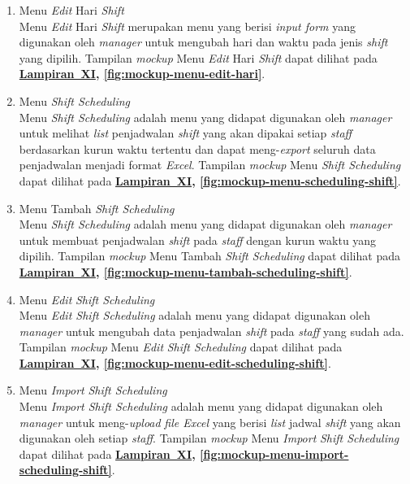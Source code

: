 \begin{enumerate}
    \item Menu \textit{Edit} Hari \textit{Shift}
    \\ Menu \textit{Edit} Hari \textit{Shift} merupakan menu yang berisi \textit{input form} yang digunakan oleh \textit{manager} untuk mengubah hari dan waktu pada jenis \textit{shift} yang dipilih. Tampilan \textit{mockup} Menu \textit{Edit} Hari \textit{Shift} dapat dilihat pada \textbf{\hyperref[sec:mockup-aplikasi-presensi-online]{Lampiran~XI}, \ref{fig:mockup-menu-edit-hari}}.

    \item Menu \textit{Shift Scheduling}
    \\ Menu \textit{Shift Scheduling} adalah menu yang didapat digunakan oleh \textit{manager} untuk melihat \textit{list} penjadwalan \textit{shift} yang akan dipakai setiap \textit{staff} berdasarkan kurun waktu tertentu dan dapat meng-\textit{export} seluruh data penjadwalan menjadi format \textit{Excel}. Tampilan \textit{mockup} Menu \textit{Shift Scheduling} dapat dilihat pada \textbf{\hyperref[sec:mockup-aplikasi-presensi-online]{Lampiran~XI}, \ref{fig:mockup-menu-scheduling-shift}}.

    \item Menu Tambah \textit{Shift Scheduling}
    \\ Menu \textit{Shift Scheduling} adalah menu yang didapat digunakan oleh \textit{manager} untuk membuat penjadwalan \textit{shift} pada \textit{staff} dengan kurun waktu yang dipilih. Tampilan \textit{mockup} Menu Tambah \textit{Shift Scheduling} dapat dilihat pada \textbf{\hyperref[sec:mockup-aplikasi-presensi-online]{Lampiran~XI}, \ref{fig:mockup-menu-tambah-scheduling-shift}}.

    \item Menu \textit{Edit} \textit{Shift Scheduling}
    \\ Menu \textit{Edit Shift Scheduling} adalah menu yang didapat digunakan oleh \textit{manager} untuk mengubah data penjadwalan \textit{shift} pada \textit{staff} yang sudah ada. Tampilan \textit{mockup} Menu \textit{Edit} \textit{Shift Scheduling} dapat dilihat pada \textbf{\hyperref[sec:mockup-aplikasi-presensi-online]{Lampiran~XI}, \ref{fig:mockup-menu-edit-scheduling-shift}}.

    \item Menu \textit{Import} \textit{Shift Scheduling}
    \\ Menu \textit{Import Shift Scheduling} adalah menu yang didapat digunakan oleh \textit{manager} untuk meng-\textit{upload} \textit{file Excel} yang berisi \textit{list} jadwal \textit{shift} yang akan digunakan oleh setiap \textit{staff}. Tampilan \textit{mockup} Menu \textit{Import} \textit{Shift Scheduling} dapat dilihat pada \textbf{\hyperref[sec:mockup-aplikasi-presensi-online]{Lampiran~XI}, \ref{fig:mockup-menu-import-scheduling-shift}}.

    

    \end{enumerate}